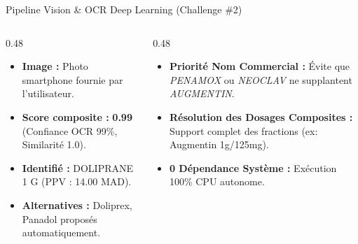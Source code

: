 \documentclass[aspectratio=169,10pt]{beamer}
\begin{document}
\begin{frame}{Pipeline Vision \& OCR Deep Learning (Challenge \#2)}

    \vspace{0.4cm}
    \begin{columns}[T]
        \begin{column}{0.48\textwidth}
            \begin{tcolorbox}[colback=white,colframe=success!80!black,arc=2mm,title={\footnotesize \faCheck~Validation Réelle : Doliprane 1000 mg},coltitle=white]
                \scriptsize
                \begin{itemize}
                    \item \textbf{Image :} Photo smartphone fournie par l'utilisateur.
                    \item \textbf{Score composite :} \textbf{0.99} (Confiance OCR 99\%, Similarité 1.0).
                    \item \textbf{Identifié :} DOLIPRANE 1 G (PPV : 14.00 MAD).
                    \item \textbf{Alternatives :} Doliprex, Panadol proposés automatiquement.
                \end{itemize}
            \end{tcolorbox}
        \end{column}

        \begin{column}{0.48\textwidth}
            \begin{tcolorbox}[colback=white,colframe=accent,arc=2mm,title={\footnotesize \faCogs~Optimisations Clés Appliquées},coltitle=white]
                \scriptsize
                \begin{itemize}
                    \item \textbf{Priorité Nom Commercial :} Évite que \textit{PENAMOX} ou \textit{NEOCLAV} ne supplantent \textit{AUGMENTIN}.
                    \item \textbf{Résolution des Dosages Composites :} Support complet des fractions (ex: Augmentin 1g/125mg).
                    \item \textbf{0 Dépendance Système :} Exécution 100\% CPU autonome.
                \end{itemize}
            \end{tcolorbox}
        \end{column}
    \end{columns}
\end{frame}
\end{document}
